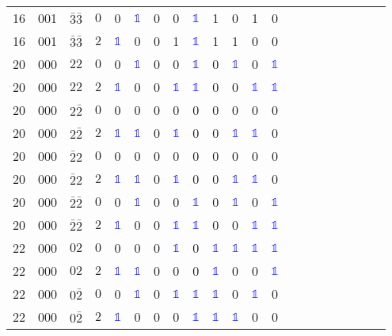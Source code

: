 \begin{longtable*}{c| cccccccccccccccccccc }
16& 001& $\bar{3}\bar{3}$& $0$& 0& \textcolor{blue}{$\mathds{1}$}& 0& 0& \textcolor{blue}{$\mathds{1}$}& 1& 0& 1& 0\\
16& 001& $\bar{3}\bar{3}$& $2$& \textcolor{blue}{$\mathds{1}$}& 0& 0& 1& \textcolor{blue}{$\mathds{1}$}& 1& 1& 0& 0\\
20& 000& $22$& $0$& 0& \textcolor{blue}{$\mathds{1}$}& 0& 0& \textcolor{blue}{$\mathds{1}$}& 0& \textcolor{blue}{$\mathds{1}$}& 0& \textcolor{blue}{$\mathds{1}$}\\
20& 000& $22$& $2$& \textcolor{blue}{$\mathds{1}$}& 0& 0& \textcolor{blue}{$\mathds{1}$}& \textcolor{blue}{$\mathds{1}$}& 0& 0& \textcolor{blue}{$\mathds{1}$}& \textcolor{blue}{$\mathds{1}$}\\
20& 000& $2\bar{2}$& $0$& 0& 0& 0& 0& 0& 0& 0& 0& 0\\
20& 000& $2\bar{2}$& $2$& \textcolor{blue}{$\mathds{1}$}& \textcolor{blue}{$\mathds{1}$}& 0& \textcolor{blue}{$\mathds{1}$}& 0& 0& \textcolor{blue}{$\mathds{1}$}& \textcolor{blue}{$\mathds{1}$}& 0\\
20& 000& $\bar{2}2$& $0$& 0& 0& 0& 0& 0& 0& 0& 0& 0\\
20& 000& $\bar{2}2$& $2$& \textcolor{blue}{$\mathds{1}$}& \textcolor{blue}{$\mathds{1}$}& 0& \textcolor{blue}{$\mathds{1}$}& 0& 0& \textcolor{blue}{$\mathds{1}$}& \textcolor{blue}{$\mathds{1}$}& 0\\
20& 000& $\bar{2}\bar{2}$& $0$& 0& \textcolor{blue}{$\mathds{1}$}& 0& 0& \textcolor{blue}{$\mathds{1}$}& 0& \textcolor{blue}{$\mathds{1}$}& 0& \textcolor{blue}{$\mathds{1}$}\\
20& 000& $\bar{2}\bar{2}$& $2$& \textcolor{blue}{$\mathds{1}$}& 0& 0& \textcolor{blue}{$\mathds{1}$}& \textcolor{blue}{$\mathds{1}$}& 0& 0& \textcolor{blue}{$\mathds{1}$}& \textcolor{blue}{$\mathds{1}$}\\
22& 000& $02$& $0$& 0& 0& 0& \textcolor{blue}{$\mathds{1}$}& 0& \textcolor{blue}{$\mathds{1}$}& \textcolor{blue}{$\mathds{1}$}& \textcolor{blue}{$\mathds{1}$}& \textcolor{blue}{$\mathds{1}$}\\
22& 000& $02$& $2$& \textcolor{blue}{$\mathds{1}$}& \textcolor{blue}{$\mathds{1}$}& 0& 0& 0& \textcolor{blue}{$\mathds{1}$}& 0& 0& \textcolor{blue}{$\mathds{1}$}\\
22& 000& $0\bar{2}$& $0$& 0& \textcolor{blue}{$\mathds{1}$}& 0& \textcolor{blue}{$\mathds{1}$}& \textcolor{blue}{$\mathds{1}$}& \textcolor{blue}{$\mathds{1}$}& 0& \textcolor{blue}{$\mathds{1}$}& 0\\
22& 000& $0\bar{2}$& $2$& \textcolor{blue}{$\mathds{1}$}& 0& 0& 0& \textcolor{blue}{$\mathds{1}$}& \textcolor{blue}{$\mathds{1}$}& \textcolor{blue}{$\mathds{1}$}& 0& 0\\

\end{longtable*}
